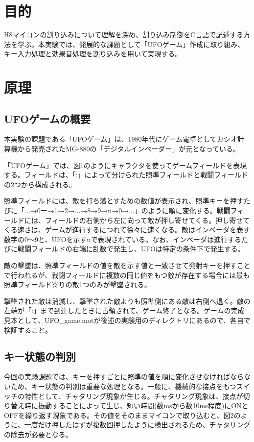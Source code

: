 ﻿\documentclass{jarticle}
\begin{document}
\section{目的}
H8マイコンの割り込みについて理解を深め、割り込み制御をC言語で記述する方法を学ぶ。本実験では、発展的な課題として「UFOゲーム」作成に取り組み、キー入力処理と効果音処理を割り込みを用いて実現する。

\section{原理}
\subsection{UFOゲームの概要}
本実験の課題である「UFOゲーム」は、1980年代にゲーム電卓としてカシオ計算機から発売されたMG-880の「デジタルインベーダー」が元となっている。


「UFOゲーム」では、図1のようにキャラクタを使ってゲームフィールドを表現する。フィールドは、「:」によって分けられた照準フィールドと戦闘フィールドの2つから構成される。


照準フィールドには、敵を打ち落とすための数値が表示され、照準キーを押すたびに「...→0ー→1→2→...→8→9→n→0→...」のように順に変化する。戦闘フィールドには、フィールドの右側から左に向って敵が押し寄せてくる。押し寄せてくる速さは、ゲームが進行するにつれて徐々に速くなる。敵はインベーダを表す数字の0〜9と、UFOを示すnで表現されている。なお、インベーダは進行するたびに戦闘フィールドの右端に乱数で発生し、UFOは特定の条件下で発生する。


敵の撃墜は、照準フィールドの値を敵を示す値と一致させて発射キーを押すことで行われるが、戦闘フィールドに複数の同じ値をもつ敵が存在する場合には最も照準フィールド寄りの敵1つのみが撃墜される。


撃墜された敵は消滅し、撃墜された敵よりも照準側にある敵は右側へ退く。敵の左端が「:」まで到達したときに占領されて、ゲーム終了となる。ゲームの完成見本として、UFO\_game.motが後述の実験用のディレクトリにあるので、各自で検証すること。

\subsection{キー状態の判別}
今回の実験課題では、キーを押すごとに照準の値を順に変化させなければならないため、キー状態の判別は重要な処理となる。一般に、機械的な接点をもつスイッチの特性として、チャタリング現象が生じる。チャタリング現象は、接点が切り替え時に振動することによって生じ、短い時間(数msから数10ms程度)にONとOFFを繰り返す現象である。その値をそのままマイコンで取り込むと、図2のように、一度だけ押したはずが複数回押したように検出されるため、チャタリングの除去が必要となる。
\end{document}
